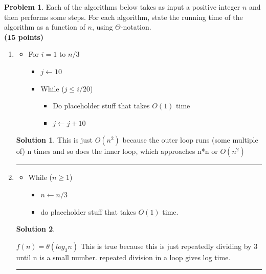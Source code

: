 \documentclass{article}
\theoremstyle{definition}
\newtheorem{problem}{Problem}
\def\fline{\rule{0.75\linewidth}{0.5pt}}
\newcommand{\finishline}{
  \begin{center}\fline
\end{center}}
\newtheorem*{solution*}{Solution}
\newenvironment{solution}{
\begin{solution*}}{{\finishline}
\end{solution*}}
\newcommand{\grade}[1]{\hfill{\textbf{($\mathbf{#1}$ points)}}}
\begin{document}
    \smallskip

    \begin{problem}
      Each of the algorithms below takes as input a positive integer $n$ and then performs some steps. For each algorithm, state the running time of the algorithm as a function of $n$, using $\Theta$-notation.\\ \grade{15}

    \begin{enumerate}[label =\alph*)]
      \item
        \begin{itemize}
          \item For $i = 1$ to $n/3$
            \begin{itemize}
              \item $j \gets 10$
              \item While ($j \leq i/20$)
                \begin{itemize}
                  \item Do placeholder stuff that takes $O(1)$ time
                  \item $j \gets j + 10$
                \end{itemize}
            \end{itemize}
        \end{itemize}

        \begin{solution}
          This is just $O(n^2)$ because the outer loop runs (some multiple of) n times and so does the inner loop, which approaches n*n or $O(n^2)$
        \end{solution}

      \item

        \begin{itemize}
          \item While ($n \geq 1$)
            \begin{itemize}
              \item $n \gets n/3$
              \item do placeholder stuff that takes $O(1)$ time.
            \end{itemize}
        \end{itemize}
        \begin{solution}
          \

          $f(n) = \theta(log_3 n)$ This is true because this is just repeatedly dividing by 3 until n is a small number. repeated division in a loop gives log time.
        \end{solution}


\end{enumerate}
\end{problem}
\end{document}
